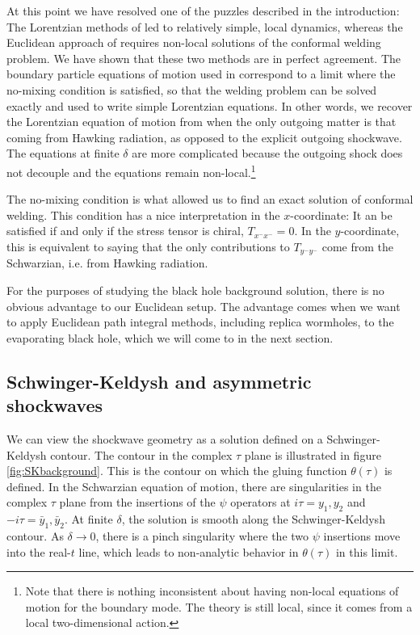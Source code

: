 \documentclass[12pt]{article}
\numberwithin{equation}{section}
\newcommand{\by}{\bar{y}}
\begin{document}
\begin{spacing}{1.1}
At this point we have resolved one of the puzzles described in the introduction: The Lorentzian methods of \cite{Maldacena:2016upp,Engelsoy:2016xyb,Almheiri:2019psf} led to relatively simple, local dynamics, whereas the Euclidean approach of \cite{Almheiri:2019qdq} requires non-local solutions of the conformal welding problem. We have shown that these two methods are in perfect agreement. The boundary particle equations of  motion used in \cite{Maldacena:2016upp,Engelsoy:2016xyb,Almheiri:2019psf} correspond to a limit where the no-mixing condition is satisfied, so that the welding problem can be solved exactly and used to write simple Lorentzian equations. In other words, we recover the Lorentzian equation of motion from \cite{Maldacena:2016upp,Engelsoy:2016xyb} when the only outgoing matter is that coming from Hawking radiation, as opposed to the explicit outgoing shockwave. The equations at finite $\delta$ are more complicated because the outgoing shock does not decouple and the equations remain non-local.\footnote{Note that there is nothing inconsistent about having non-local equations of motion for the boundary mode. The theory is still local, since it comes from a local two-dimensional action. 
}

The no-mixing condition is what allowed us to find an exact solution of conformal welding. This condition has a nice interpretation in the $x$-coordinate: It an be satisfied if and only if the stress tensor is chiral, $T_{x^- x^-} = 0$. In the $y$-coordinate, this is equivalent to saying that the only contributions to $T_{y^- y^-}$ come from the Schwarzian, i.e. from Hawking radiation.

For the purposes of studying the black hole background solution, there is no obvious advantage to our Euclidean setup. The advantage comes when we want to apply Euclidean path integral methods, including replica wormholes, to the evaporating black hole, which we will come to in the next section.




\subsection{Schwinger-Keldysh and asymmetric shockwaves}

We can view the shockwave geometry as a solution defined on a Schwinger-Keldysh contour\cite{Jana:2020vyx}. The contour in the complex $\tau$ plane is illustrated in figure \ref{fig:SKbackground}. This is the contour on which the gluing function $\theta(\tau)$ is defined. In the Schwarzian equation of motion, there are singularities in the complex $\tau$ plane from the insertions of the $\psi$ operators at $i\tau = y_1, y_2$ and $-i\tau = \by_1,\by_2$. At finite $\delta$, the solution is smooth along the Schwinger-Keldysh contour. As $\delta \to 0$, there is a pinch singularity where the two $\psi$ insertions move into the real-$t$ line, which leads to non-analytic behavior in $\theta(\tau)$ in this limit. 


\end{spacing}
\end{document}
